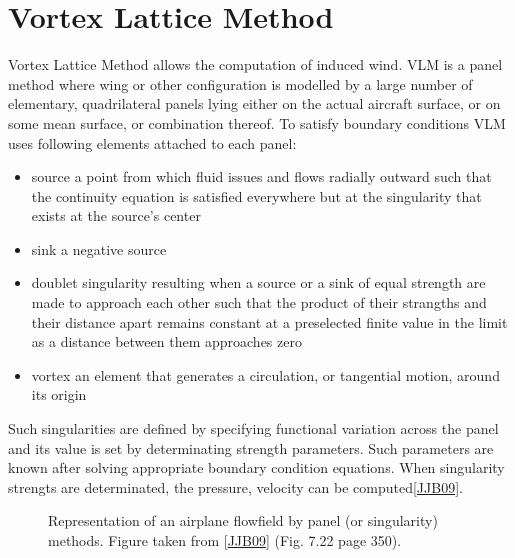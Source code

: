 \documentclass[letterpaper,10pt,english]{jupyterBook}
\begin{document}
\chapter{Vortex Lattice Method}
\label{\detokenize{chapters/description/theory:vortex-lattice-method}}
\sphinxAtStartPar
Vortex Lattice Method allows the computation of induced wind. VLM is a panel method where wing or other configuration is modelled by a large number of elementary, quadrilateral panels lying either on the actual aircraft surface, or on some mean surface, or combination thereof. To satisfy boundary conditions VLM uses following elements attached to each panel:
\begin{itemize}
\item {} 
\sphinxAtStartPar
source \sphinxhyphen{} a point from which fluid issues and flows radially outward such that the continuity equation is satisfied everywhere but at the singularity that exists at the source’s center

\item {} 
\sphinxAtStartPar
sink \sphinxhyphen{} a negative source

\item {} 
\sphinxAtStartPar
doublet \sphinxhyphen{}  singularity resulting when a source or a sink of equal strength are made to approach each other such that the product of their strangths and their distance apart remains constant at a preselected finite value in the limit as a distance between them approaches zero

\item {} 
\sphinxAtStartPar
vortex \sphinxhyphen{} an element that generates a circulation, or tangential motion, around its origin

\end{itemize}

\sphinxAtStartPar
Such singularities are defined by specifying functional variation across the panel and its value is set by determinating strength parameters. Such parameters are known after solving appropriate boundary condition equations. When singularity strengts are determinated, the pressure, velocity can be computed{[}\hyperlink{cite.chapters/bibliography:id5}{JJB09}{]}.

\begin{figure}[htbp]
\centering
\capstart

\noindent{}
\caption{Representation of an airplane flowfield by panel (or singularity) methods. Figure taken from {[}\hyperlink{cite.chapters/bibliography:id5}{JJB09}{]} (Fig. 7.22 page 350).}\label{\detokenize{chapters/description/theory:panel-method}}\end{figure}
\end{document}
